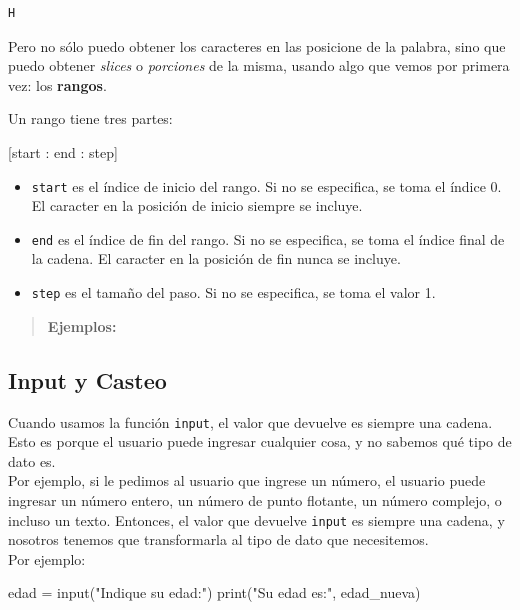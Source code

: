 \documentclass[
  letterpaper,
  DIV=11,
  numbers=noendperiod]{scrreprt}
\newenvironment{Shaded}{\begin{snugshade}}{\end{snugshade}}
\newcommand{\BuiltInTok}[1]{\textcolor[rgb]{0.00,0.23,0.31}{#1}}
\newcommand{\NormalTok}[1]{\textcolor[rgb]{0.00,0.23,0.31}{#1}}
\newcommand{\OperatorTok}[1]{\textcolor[rgb]{0.37,0.37,0.37}{#1}}
\newcommand{\StringTok}[1]{\textcolor[rgb]{0.13,0.47,0.30}{#1}}
\providecommand{\tightlist}{%
  \setlength{\itemsep}{0pt}\setlength{\parskip}{0pt}}\usepackage{longtable,booktabs,array}
\begin{document}
\begin{verbatim}
H
\end{verbatim}

Pero no sólo puedo obtener los caracteres en las posicione de la
palabra, sino que puedo obtener \emph{slices} o \emph{porciones} de la
misma, usando algo que vemos por primera vez: los \textbf{rangos}.

Un rango tiene tres partes:

\begin{Shaded}
\begin{Highlighting}[]
\NormalTok{[start : end : step]}
\end{Highlighting}
\end{Shaded}

\begin{itemize}
\tightlist
\item
  \texttt{start} es el índice de inicio del rango. Si no se especifica,
  se toma el índice 0. El caracter en la posición de inicio siempre se
  incluye.
\item
  \texttt{end} es el índice de fin del rango. Si no se especifica, se
  toma el índice final de la cadena. El caracter en la posición de fin
  nunca se incluye.
\item
  \texttt{step} es el tamaño del paso. Si no se especifica, se toma el
  valor 1.
\end{itemize}

\begin{quote}
\textbf{Ejemplos:}
\end{quote}

\subsection{Input y Casteo}\label{input-y-casteo}

Cuando usamos la función \texttt{input}, el valor que devuelve es
siempre una cadena. Esto es porque el usuario puede ingresar cualquier
cosa, y no sabemos qué tipo de dato es.\\

Por ejemplo, si le pedimos al usuario que ingrese un número, el usuario
puede ingresar un número entero, un número de punto flotante, un número
complejo, o incluso un texto. Entonces, el valor que devuelve
\texttt{input} es siempre una cadena, y nosotros tenemos que
transformarla al tipo de dato que necesitemos.\\

Por ejemplo:

\begin{Shaded}
\begin{Highlighting}[]
\NormalTok{edad }\OperatorTok{=} \BuiltInTok{input}\NormalTok{(}\StringTok{"Indique su edad:"}\NormalTok{)}
\BuiltInTok{print}\NormalTok{(}\StringTok{"Su edad es:"}\NormalTok{, edad\_nueva)}
\end{Highlighting}
\end{Shaded}
\end{document}

